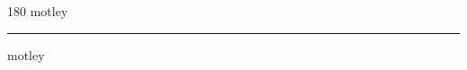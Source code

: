 
\begin{frame}
\begin{center}
\begin{turn}{180}
{\fontsize{2.5cm}{1em}\selectfont motley}
\end{turn}
\vspace{1em}\par  
\hrule
\vspace{1em}\par  
{\fontsize{2.5cm}{1em}\selectfont motley}
\end{center}
\end{frame}
